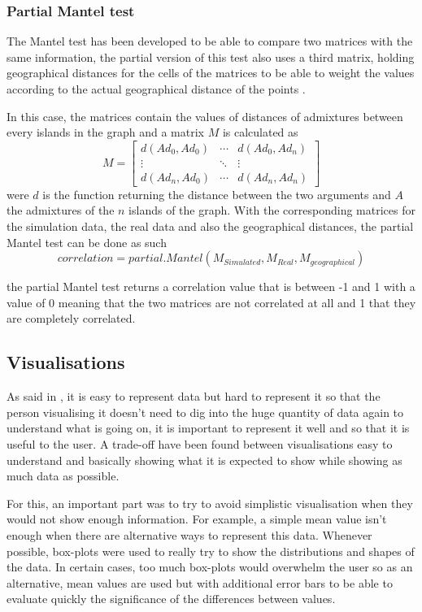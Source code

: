 \documentclass[a4paper,12pt]{report}
\begin{document}
\subsubsection{Partial Mantel test}
The Mantel test has been developed to be able to compare two matrices with the same information, the partial version of this test also uses a third matrix, holding geographical distances for the cells of the matrices to be able to weight the values according to the actual geographical distance of the points \cite{Smo01}.

In this case, the matrices contain the values of distances of admixtures between every islands in the graph and a matrix $M$ is calculated as
\begin{equation}
	M = \begin{bmatrix}
		d(Ad_0, Ad_0)	& \cdots & d(Ad_0, Ad_n) \\
		\vdots			& \ddots & \vdots		 \\
		d(Ad_n, Ad_0)	& \cdots & d(Ad_n, Ad_n)
	\end{bmatrix}
\end{equation}
were $d$ is the function returning the distance between the two arguments and $A$ the admixtures of the $n$ islands of the graph. With the corresponding matrices for the simulation data, the real data and also the geographical distances, the partial Mantel test can be done as such
\begin{equation}
	correlation = partial.Mantel(M_{Simulated}, M_{Real}, M_{geographical})
\end{equation}

the partial Mantel test returns a correlation value that is between -1 and 1 with a value of 0 meaning that the two matrices are not correlated at all and 1 that they are completely correlated.

\subsection{Visualisations}
As said in \cite{Wei01}, it is easy to represent data but hard to represent it so that the person visualising it doesn’t need to dig into the huge quantity of data again to understand what is going on, it is important to represent it well and so that it is useful to the user. A trade-off have been found between visualisations easy to understand and basically showing what it is expected to show while showing as much data as possible.

For this, an important part was to try to avoid simplistic visualisation when they would not show enough information. For example, a simple mean value isn’t enough when there are alternative ways to represent this data. Whenever possible, box-plots were used to really try to show the distributions and shapes of the data. In certain cases, too much box-plots would overwhelm the user so as an alternative, mean values are used but with additional error bars to be able to evaluate quickly the significance of the differences between values.
\end{document}
